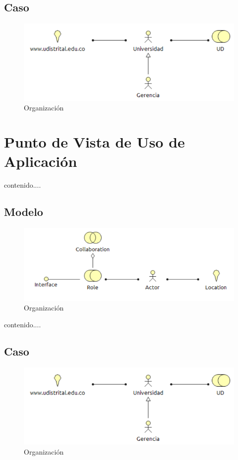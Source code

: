 \subsection{Caso}
\begin{figure}[th!]
	\centering
	\includegraphics[width=0.8\linewidth]{arquitectura_diseno/imgs/C_Organizacion}
	\caption{Organización}
\end{figure}
\newpage
\section{Punto de Vista de Uso de Aplicación}
contenido....
\subsection{Modelo}
\begin{figure}[th!]
	\centering
	\includegraphics[width=0.8\linewidth]{arquitectura_diseno/imgs/M_Organizacion}
	\caption{Organización}
\end{figure}
\newpage
contenido....
\subsection{Caso}
\begin{figure}[th!]
	\centering
	\includegraphics[width=0.8\linewidth]{arquitectura_diseno/imgs/C_Organizacion}
	\caption{Organización}
\end{figure}